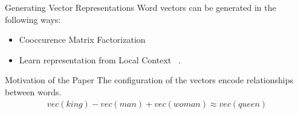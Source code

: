 \begin{frame}{Generating Vector Representations}
  Word vectors can be generated in the following ways:
  \begin{itemize}[<+->]
  \item Cooccurence Matrix Factorization ~\cite{Deerwester}
  \item Learn representation from Local Context ~\cite{Mikolov13a}.
  \end{itemize}
\end{frame}

\begin{frame}{Motivation of the Paper}
  The configuration of the vectors encode relationships between words.
  \begin{align*}
    vec(king) - vec(man) + vec(woman) \approx vec(queen)
  \end{align*}
\end{frame}

